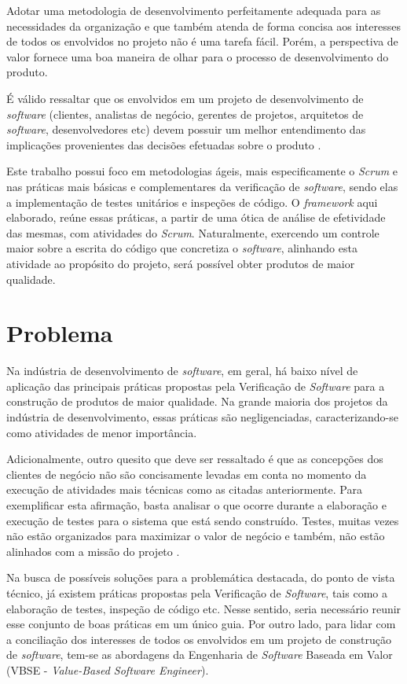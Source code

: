 Adotar uma metodologia de desenvolvimento perfeitamente adequada para as necessidades da organização e que também atenda de forma concisa aos interesses de todos os envolvidos no projeto não é uma tarefa fácil. Porém, a perspectiva de valor fornece uma boa maneira de olhar para o processo de desenvolvimento do produto.

É válido ressaltar que os envolvidos em um projeto de desenvolvimento de \textit{software} (clientes, analistas de negócio, gerentes de projetos, arquitetos de \textit{software}, desenvolvedores etc) devem possuir um melhor entendimento das implicações provenientes das decisões efetuadas sobre o produto \cite{vbse1}.

Este trabalho possui foco em metodologias ágeis, mais especificamente o \textit{Scrum} e nas práticas mais básicas e complementares da verificação de \textit{software}, sendo elas a implementação de testes unitários e inspeções de código. O \textit{framework} aqui elaborado, reúne essas práticas, a partir de uma ótica de análise de efetividade das mesmas, com atividades do \textit{Scrum}. Naturalmente, exercendo um controle maior sobre a escrita do código que concretiza o \textit{software}, alinhando esta atividade ao propósito do projeto, será possível obter produtos de maior qualidade.

\section{Problema}

Na indústria de desenvolvimento de \textit{software}, em geral, há baixo nível de aplicação das principais práticas propostas pela Verificação de \textit{Software} para a construção de produtos de maior qualidade. Na grande maioria dos projetos da indústria de desenvolvimento, essas práticas são negligenciadas, caracterizando-se como atividades de menor importância.	

Adicionalmente, outro quesito que deve ser ressaltado é que as concepções dos clientes de negócio não são concisamente levadas em conta no momento da execução de atividades mais técnicas como as citadas anteriormente. Para exemplificar esta afirmação, basta analisar o que ocorre durante a elaboração e execução de testes para o sistema que está sendo construído. Testes, muitas vezes não estão organizados para maximizar o valor de negócio e também, não estão alinhados com a missão do projeto \cite{vbse2}.

Na busca de possíveis soluções para a problemática destacada, do ponto de vista técnico, já existem práticas propostas pela Verificação de \textit{Software}, tais como a elaboração de testes, inspeção de código etc. Nesse sentido, seria necessário reunir esse conjunto de boas práticas em um único guia. Por outro lado, para lidar com a conciliação dos interesses de todos os envolvidos em um projeto de construção de \textit{software}, tem-se as abordagens da Engenharia de \textit{Software} Baseada em Valor (VBSE - \textit{Value-Based Software Engineer}).

